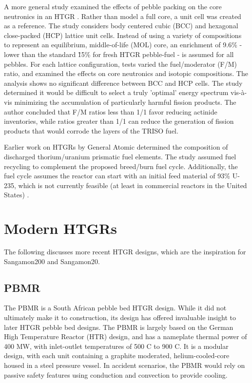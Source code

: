 A more general study examined the effects of pebble packing on the core neutronics in an HTGR \cite{turkmen_effect_2012}.  Rather than model a full core, a unit cell was created as a reference.  The study considers body centered cubic (BCC) and hexagonal close-packed (HCP) lattice unit cells.  Instead of using a variety of compositions to represent an equilibrium, middle-of-life (MOL) core, an enrichment of 9.6\%  - lower than the standard \~15\% for fresh HTGR pebble-fuel - is assumed for all pebbles.  For each lattice configuration, tests varied the fuel/moderator (F/M) ratio, and examined the effects on core neutronics and isotopic compositions.  The analysis shows no significant difference between BCC and HCP cells.  The study determined it would be difficult to select a truly 'optimal' energy spectrum vis-\`{a}-vis minimizing the accumulation of particularly harmful fission products.  The author concluded that F/M ratios less than 1/1 favor reducing actinide inventories, while ratios greater than 1/1 can reduce the generation of fission products that would corrode the layers of the TRISO fuel.

Earlier work on HTGRs by General Atomic determined the composition of discharged thorium/uranium prismatic fuel elements.  The study assumed fuel recycling to complement the proposed breed/burn fuel cycle.  Additionally, the fuel cycle assumes the reactor can start with an initial feed material of 93\% U-235, which is not currently feasible (at least in commercial reactors in the United States) \cite{hamilton_htgr_1976}.


\section{Modern HTGRs}

The following discusses more recent HTGR designs, which are the inspiration for Sangamon200 and Sangamon20.

\subsection{PBMR}

The PBMR is a South African pebble bed HTGR design.  While it did not ultimately make it to construction, its design has offered invaluable insight to later HTGR pebble bed designs.  The PBMR is largely based on the German High Temperature Reactor (HTR) design, and has a nameplate thermal power of 400 MW, with inlet-outlet temperatures of 500 \textdegree C to 900 \textdegree C.  It is a modular design, with each unit containing a graphite moderated, helium-cooled-core housed in a steel pressure vessel.  In accident scenarios, the PBMR would rely on passive safety features using conduction and convection to provide cooling.

